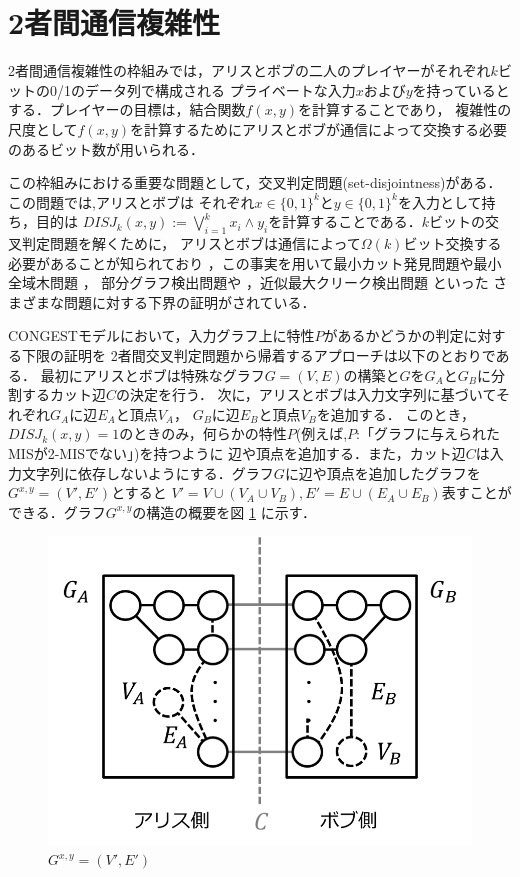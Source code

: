 \documentclass[12pt]{thesis}
\newcommand{\CONGEST}{\textsf{CONGEST}}
\theoremstyle{definition}
\begin{document}
\section{2者間通信複雑性}
2者間通信複雑性の枠組みでは，アリスとボブの二人のプレイヤーがそれぞれ$k$ビットの0/1のデータ列で構成される
プライベートな入力$x$および$y$を持っているとする．プレイヤーの目標は，結合関数$f(x, y)$を計算することであり，
複雑性の尺度として$f(x, y)$を計算するためにアリスとボブが通信によって交換する必要のあるビット数が用いられる．

この枠組みにおける重要な問題として，交叉判定問題(set-disjointness)がある．この問題では,アリスとボブは
それぞれ$x \in \{0, 1\}^{k}$と$y \in \{0, 1\}^{k}$を入力として持ち，目的は
$DISJ_{k} (x, y) :=\bigvee_{i = 1}^{k} x_{i} \land y_{i}$を計算することである．$k$ビットの交叉判定問題を解くために，
アリスとボブは通信によって$\Omega (k)$ビット交換する必要があることが知られており 
\cite{kalyanasundaram1992probabilistic}，この事実を用いて最小カット発見問題や最小全域木問題 \cite{sarma2012distributed}，
部分グラフ検出問題や \cite{fischer2018possibilities} ，近似最大クリーク検出問題 \cite{czumaj2020detecting} といった
さまざまな問題に対する下界の証明がされている．

{\CONGEST}モデルにおいて，入力グラフ上に特性$P$があるかどうかの判定に対する下限の証明を
2者間交叉判定問題から帰着するアプローチは以下のとおりである．
最初にアリスとボブは特殊なグラフ$G = (V, E)$の構築と$G$を$G_{A}$と$G_{B}$に分割するカット辺$C$の決定を行う．
次に，アリスとボブは入力文字列に基づいてそれぞれ$G_{A}$に辺$E_{A}$と頂点$V_{A}$，
$G_{B}$に辺$E_{B}$と頂点$V_{B}$を追加する．
このとき，$DISJ_{k} (x, y)=1$のときのみ，何らかの特性$P$(例えば,$P$:「グラフに与えられたMISが2-MISでない」)を持つように
辺や頂点を追加する．また，カット辺$C$は入力文字列に依存しないようにする．グラフ$G$に辺や頂点を追加したグラフを
$G^{x, y} = (V', E')$とすると
$V' = V \cup (V_{A} \cup V_{B}), E' = E \cup (E_{A} \cup E_{B})$表すことができる．グラフ$G^{x, y}$の構造の概要を図 \ref{Gxy} に示す．

\begin{figure}[ht]
\begin{center}
\includegraphics[width=120mm]{Gxy.png}
\end{center}
\caption{$G^{x, y} = (V', E')$}
\label{Gxy}
\end{figure}
\end{document}
